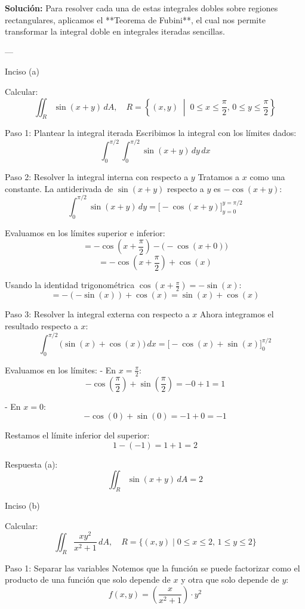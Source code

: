 \documentclass[12pt,a4paper]{report}
\newcommand{\solutionname}{Solución:}
\newenvironment{solution}{
 	\par\noindent\textbf{\color{structurecolor}\solutionname}
 	\color{black!90}}{\hfill\quad\par}
\begin{document}
\begin{solution}
Para resolver cada una de estas integrales dobles sobre regiones rectangulares, aplicamos el **Teorema de Fubini**, el cual nos permite transformar la integral doble en integrales iteradas sencillas.

---

 Inciso (a)

Calcular:
$$\iint_{R} \sin(x + y) \, dA, \quad R = \left\{(x, y) \;\middle|\; 0 \le x \le \frac{\pi}{2}, \, 0 \le y \le \frac{\pi}{2}\right\}$$

 Paso 1: Plantear la integral iterada
Escribimos la integral con los límites dados:
$$\int_{0}^{\pi/2} \int_{0}^{\pi/2} \sin(x + y) \, dy \, dx$$

 Paso 2: Resolver la integral interna con respecto a $y$
Tratamos a $x$ como una constante. La antiderivada de $\sin(x + y)$ respecto a $y$ es $-\cos(x + y)$:
$$\int_{0}^{\pi/2} \sin(x + y) \, dy = \Big[ -\cos(x + y) \Big]_{y=0}^{y=\pi/2}$$

Evaluamos en los límites superior e inferior:
$$= -\cos\left(x + \frac{\pi}{2}\right) - \big(-\cos(x + 0)\big)$$
$$= -\cos\left(x + \frac{\pi}{2}\right) + \cos(x)$$

Usando la identidad trigonométrica $\cos\left(x + \frac{\pi}{2}\right) = -\sin(x)$:
$$= -(-\sin(x)) + \cos(x) = \sin(x) + \cos(x)$$

 Paso 3: Resolver la integral externa con respecto a $x$
Ahora integramos el resultado respecto a $x$:
$$\int_{0}^{\pi/2} \big(\sin(x) + \cos(x)\big) \, dx = \Big[ -\cos(x) + \sin(x) \Big]_{0}^{\pi/2}$$

Evaluamos en los límites:
- En $x = \frac{\pi}{2}$:
  $$-\cos\left(\frac{\pi}{2}\right) + \sin\left(\frac{\pi}{2}\right) = -0 + 1 = 1$$

- En $x = 0$:
  $$-\cos(0) + \sin(0) = -1 + 0 = -1$$

Restamos el límite inferior del superior:
$$1 - (-1) = 1 + 1 = 2$$

Respuesta (a):
$$\iint_{R} \sin(x + y) \, dA = 2$$



 Inciso (b)

Calcular:
$$\iint_{R} \frac{xy^2}{x^2 + 1} \, dA, \quad R = \big\{(x, y) \;\big|\; 0 \le x \le 2, \, 1 \le y \le 2\big\}$$

Paso 1: Separar las variables
Notemos que la función se puede factorizar como el producto de una función que solo depende de $x$ y otra que solo depende de $y$:
$$f(x, y) = \left(\frac{x}{x^2 + 1}\right) \cdot y^2$$


\end{solution}
\end{document}
